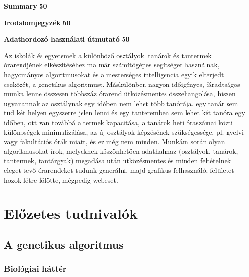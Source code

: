 \documentclass[12pt,a4paper]{report}
\begin{document}
\tableofcontents

\noindent \textbf{Summary} \hfill{\textbf{50}}

\noindent \textbf{Irodalomjegyzék} \hfill{\textbf{50}}

\noindent \textbf{Adathordozó használati útmutató} \hfill{\textbf{50}}

\cleardoublepage
{}

\newpage

\pagestyle{fancy}


Az iskolák és egyetemek a különböző osztályok, tanárok és tantermek órarendjének 
elkészítéséhez ma már számítógépes segítséget használnak, hagyományos algoritmusokat és a
mesterséges intelligencia egyik elterjedt eszközét, a genetikus algoritmust. Máskülönben 
nagyon időigényes, fáradtságos munka lenne összesen többszáz órarend ütközésmentes 
összehangolása, hiszen ugyanannak az osztálynak egy időben nem lehet több tanórája, egy tanár
sem tud két helyen egyszerre jelen lenni és egy tanteremben sem lehet két tanóra egy időben,
ott van továbbá a termek kapacitása, a tanárok heti óraszámai közti különbségek 
minimalizálása, az új osztályok képzésének szükségessége, pl. nyelvi vagy fakultációs órák 
miatt, és ez még nem minden. Munkám során olyan algoritmusokat írok, melyeknek köszönhetően 
adathalmaz (osztályok, tanárok, tantermek, tantárgyak) megadása után ütközésmentes és minden
feltételnek eleget tevő órarendeket tudunk generálni, majd grafikus felhasználói felületet 
hozok létre fölötte, mégpedig webeset.

\newpage

\chapter{Előzetes tudnivalók}

\section{A genetikus algoritmus}

\subsection{Biológiai háttér}
\end{document}
